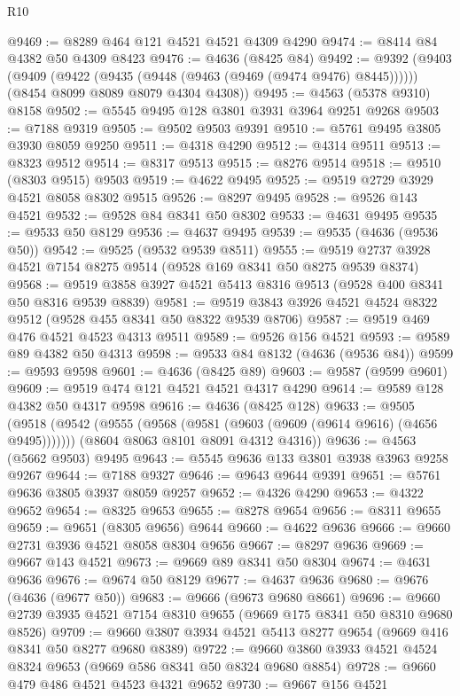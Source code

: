 \begin{lexlean}{R10}
\begin{coremodule}
@9469 := @8289 @464 @121 @4521 @4521 @4309 @4290
@9474 := @8414 @84 @4382 @50 @4309 @8423
@9476 := @4636 (@8425 @84)
@9492 := @9392
    (@9403
      (@9409 (@9422 (@9435 (@9448 (@9463 (@9469 (@9474 @9476) @8445))))))
      (@8454 @8099 @8089 @8079 @4304 @4308))
@9495 := @4563 (@5378 @9310) @8158
@9502 := @5545 @9495 @128 @3801 @3931 @3964 @9251 @9268
@9503 := @7188 @9319
@9505 := @9502 @9503 @9391
@9510 := @5761 @9495 @3805 @3930 @8059 @9250
@9511 := @4318 @4290
@9512 := @4314 @9511
@9513 := @8323 @9512
@9514 := @8317 @9513
@9515 := @8276 @9514
@9518 := @9510 (@8303 @9515) @9503
@9519 := @4622 @9495
@9525 := @9519 @2729 @3929 @4521 @8058 @8302 @9515
@9526 := @8297 @9495
@9528 := @9526 @143 @4521
@9532 := @9528 @84 @8341 @50 @8302
@9533 := @4631 @9495
@9535 := @9533 @50 @8129
@9536 := @4637 @9495
@9539 := @9535 (@4636 (@9536 @50))
@9542 := @9525 (@9532 @9539 @8511)
@9555 := @9519 @2737 @3928 @4521 @7154 @8275 @9514 (@9528 @169 @8341 @50 @8275 @9539 @8374)
@9568 := @9519 @3858 @3927 @4521 @5413 @8316 @9513 (@9528 @400 @8341 @50 @8316 @9539 @8839)
@9581 := @9519 @3843 @3926 @4521 @4524 @8322 @9512 (@9528 @455 @8341 @50 @8322 @9539 @8706)
@9587 := @9519 @469 @476 @4521 @4523 @4313 @9511
@9589 := @9526 @156 @4521
@9593 := @9589 @89 @4382 @50 @4313
@9598 := @9533 @84 @8132 (@4636 (@9536 @84))
@9599 := @9593 @9598
@9601 := @4636 (@8425 @89)
@9603 := @9587 (@9599 @9601)
@9609 := @9519 @474 @121 @4521 @4521 @4317 @4290
@9614 := @9589 @128 @4382 @50 @4317 @9598
@9616 := @4636 (@8425 @128)
@9633 := @9505
    (@9518
      (@9542 (@9555 (@9568 (@9581 (@9603 (@9609 (@9614 @9616) (@4656 @9495)))))))
      (@8604 @8063 @8101 @8091 @4312 @4316))
@9636 := @4563 (@5662 @9503) @9495
@9643 := @5545 @9636 @133 @3801 @3938 @3963 @9258 @9267
@9644 := @7188 @9327
@9646 := @9643 @9644 @9391
@9651 := @5761 @9636 @3805 @3937 @8059 @9257
@9652 := @4326 @4290
@9653 := @4322 @9652
@9654 := @8325 @9653
@9655 := @8278 @9654
@9656 := @8311 @9655
@9659 := @9651 (@8305 @9656) @9644
@9660 := @4622 @9636
@9666 := @9660 @2731 @3936 @4521 @8058 @8304 @9656
@9667 := @8297 @9636
@9669 := @9667 @143 @4521
@9673 := @9669 @89 @8341 @50 @8304
@9674 := @4631 @9636
@9676 := @9674 @50 @8129
@9677 := @4637 @9636
@9680 := @9676 (@4636 (@9677 @50))
@9683 := @9666 (@9673 @9680 @8661)
@9696 := @9660 @2739 @3935 @4521 @7154 @8310 @9655 (@9669 @175 @8341 @50 @8310 @9680 @8526)
@9709 := @9660 @3807 @3934 @4521 @5413 @8277 @9654 (@9669 @416 @8341 @50 @8277 @9680 @8389)
@9722 := @9660 @3860 @3933 @4521 @4524 @8324 @9653 (@9669 @586 @8341 @50 @8324 @9680 @8854)
@9728 := @9660 @479 @486 @4521 @4523 @4321 @9652
@9730 := @9667 @156 @4521

\end{coremodule}
\end{lexlean}
